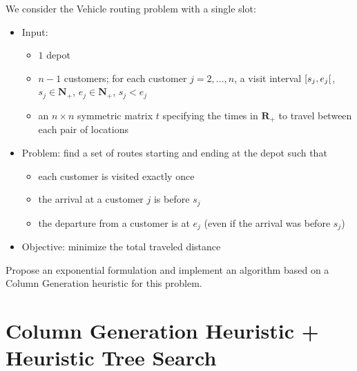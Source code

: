 \documentclass[a4paper]{article}
\newcommand{\N}{\mathbf{N}}
\newcommand{\R}{\mathbf{R}}
\begin{document}
We consider the Vehicle routing problem with a single slot:
\begin{itemize}
  \item Input:
    \begin{itemize}
      \item $1$ depot
      \item $n - 1$ customers; for each customer $j = 2, \dots, n$, a visit interval $\interval[open right]{s_j}{e_j}$, $s_j \in \N_+$, $e_j \in \N_+$, $s_j < e_j$
      \item an $n \times n$ symmetric matrix $t$ specifying the times in $\R_+$ to travel between each pair of locations
    \end{itemize}
  \item Problem: find a set of routes starting and ending at the depot such that
    \begin{itemize}
      \item each customer is visited exactly once
      \item the arrival at a customer $j$ is before $s_j$
      \item the departure from a customer is at $e_j$ (even if the arrival was before $s_j$)
    \end{itemize}
  \item Objective: minimize the total traveled distance
\end{itemize}

Propose an exponential formulation and implement an algorithm based on a Column Generation heuristic for this problem.

\section{Column Generation Heuristic + Heuristic Tree Search}
\end{document}
